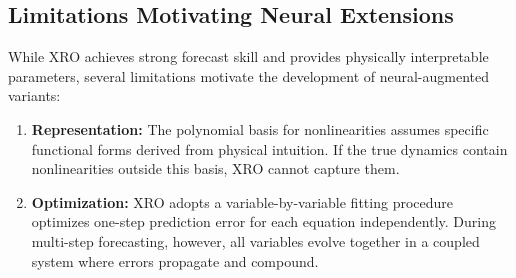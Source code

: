 \subsection{Limitations Motivating Neural Extensions}

While XRO achieves strong forecast skill and provides physically interpretable parameters, several limitations motivate the development of neural-augmented variants: 

\begin{enumerate}
    \item \textbf{Representation:} The polynomial basis for nonlinearities assumes specific functional forms derived from physical intuition. If the true dynamics contain nonlinearities outside this basis, XRO cannot capture them.
    \item \textbf{Optimization:} XRO adopts a variable-by-variable fitting procedure optimizes one-step prediction error for each equation independently. During multi-step forecasting, however, all variables evolve together in a coupled system where errors propagate and compound.
\end{enumerate}
